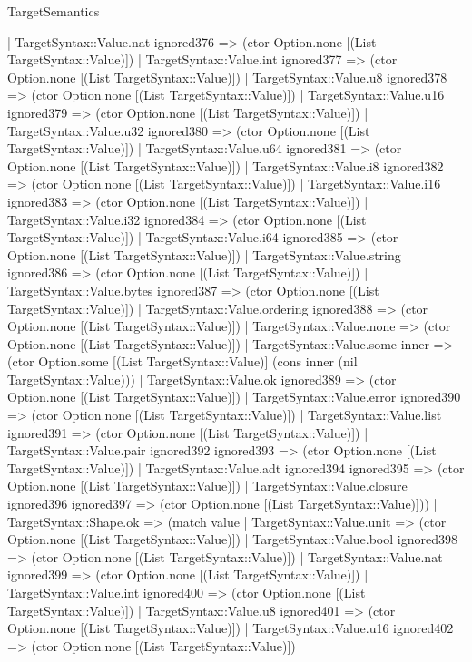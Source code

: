 \begin{lexlean}{TargetSemantics}
\begin{semanticmodule}
{      | TargetSyntax::Value.nat ignored376 => (ctor Option.none [(List TargetSyntax::Value)])
      | TargetSyntax::Value.int ignored377 => (ctor Option.none [(List TargetSyntax::Value)])
      | TargetSyntax::Value.u8 ignored378 => (ctor Option.none [(List TargetSyntax::Value)])
      | TargetSyntax::Value.u16 ignored379 => (ctor Option.none [(List TargetSyntax::Value)])
      | TargetSyntax::Value.u32 ignored380 => (ctor Option.none [(List TargetSyntax::Value)])
      | TargetSyntax::Value.u64 ignored381 => (ctor Option.none [(List TargetSyntax::Value)])
      | TargetSyntax::Value.i8 ignored382 => (ctor Option.none [(List TargetSyntax::Value)])
      | TargetSyntax::Value.i16 ignored383 => (ctor Option.none [(List TargetSyntax::Value)])
      | TargetSyntax::Value.i32 ignored384 => (ctor Option.none [(List TargetSyntax::Value)])
      | TargetSyntax::Value.i64 ignored385 => (ctor Option.none [(List TargetSyntax::Value)])
      | TargetSyntax::Value.string ignored386 => (ctor Option.none [(List TargetSyntax::Value)])
      | TargetSyntax::Value.bytes ignored387 => (ctor Option.none [(List TargetSyntax::Value)])
      | TargetSyntax::Value.ordering ignored388 => (ctor Option.none [(List TargetSyntax::Value)])
      | TargetSyntax::Value.none => (ctor Option.none [(List TargetSyntax::Value)])
      | TargetSyntax::Value.some inner => (ctor Option.some [(List TargetSyntax::Value)] (cons inner (nil TargetSyntax::Value)))
      | TargetSyntax::Value.ok ignored389 => (ctor Option.none [(List TargetSyntax::Value)])
      | TargetSyntax::Value.error ignored390 => (ctor Option.none [(List TargetSyntax::Value)])
      | TargetSyntax::Value.list ignored391 => (ctor Option.none [(List TargetSyntax::Value)])
      | TargetSyntax::Value.pair ignored392 ignored393 => (ctor Option.none [(List TargetSyntax::Value)])
      | TargetSyntax::Value.adt ignored394 ignored395 => (ctor Option.none [(List TargetSyntax::Value)])
      | TargetSyntax::Value.closure ignored396 ignored397 => (ctor Option.none [(List TargetSyntax::Value)]))
    | TargetSyntax::Shape.ok => (match value
      | TargetSyntax::Value.unit => (ctor Option.none [(List TargetSyntax::Value)])
      | TargetSyntax::Value.bool ignored398 => (ctor Option.none [(List TargetSyntax::Value)])
      | TargetSyntax::Value.nat ignored399 => (ctor Option.none [(List TargetSyntax::Value)])
      | TargetSyntax::Value.int ignored400 => (ctor Option.none [(List TargetSyntax::Value)])
      | TargetSyntax::Value.u8 ignored401 => (ctor Option.none [(List TargetSyntax::Value)])
      | TargetSyntax::Value.u16 ignored402 => (ctor Option.none [(List TargetSyntax::Value)])
}
\end{semanticmodule}
\end{lexlean}
